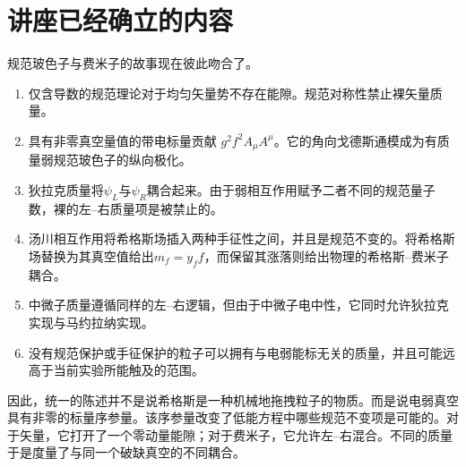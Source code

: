 \section{讲座已经确立的内容}

规范玻色子与费米子的故事现在彼此吻合了。

\begin{enumerate}
  \item 仅含导数的规范理论对于均匀矢量势不存在能隙。规范对称性禁止裸矢量质量。
  \item 具有非零真空量值的带电标量贡献
  \(g^2f^2A_\mu A^\mu\)。它的角向戈德斯通模成为有质量弱规范玻色子的纵向极化。
  \item 狄拉克质量将\(\psi_L\)与\(\psi_R\)耦合起来。由于弱相互作用赋予二者不同的规范量子数，裸的左--右质量项是被禁止的。
  \item 汤川相互作用将希格斯场插入两种手征性之间，并且是规范不变的。将希格斯场替换为其真空值给出\(m_f=y_ff\)，而保留其涨落则给出物理的希格斯--费米子耦合。
  \item 中微子质量遵循同样的左--右逻辑，但由于中微子电中性，它同时允许狄拉克实现与马约拉纳实现。
  \item 没有规范保护或手征保护的粒子可以拥有与电弱能标无关的质量，并且可能远高于当前实验所能触及的范围。
\end{enumerate}

因此，统一的陈述并不是说希格斯是一种机械地拖拽粒子的物质。而是说电弱真空具有非零的标量序参量。该序参量改变了低能方程中哪些规范不变项是可能的。对于矢量，它打开了一个零动量能隙；对于费米子，它允许左--右混合。不同的质量于是度量了与同一个破缺真空的不同耦合。